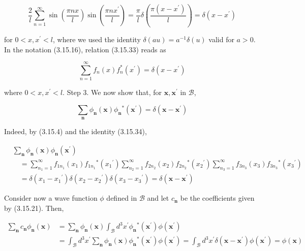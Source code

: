 \documentclass{article}
\begin{document}
\begin{equation*}
\frac{2}{l} \sum_{n=1}^{\infty} \sin \left(\frac{\pi n x}{l}\right) \sin \left(\frac{\pi n x^{\prime}}{l}\right)=\frac{\pi}{l} \delta\left(\frac{\pi\left(x-x^{\prime}\right)}{l}\right)=\delta\left(x-x^{\prime}\right) \tag{3.15.33}
\end{equation*}
 
for $0<x, x^{\prime}<l$, where we used the identity $\delta(a u)=a^{-1} \delta(u)$ valid for $a>0$. In the notation (3.15.16), relation (3.15.33) reads as
 
\begin{equation*}
\sum_{n=1}^{\infty} f_{n}(x) f_{n}^{*}\left(x^{\prime}\right)=\delta\left(x-x^{\prime}\right) \tag{3.15.34}
\end{equation*}
 
where $0<x, x^{\prime}<l$.
Step 3. We now show that, for $\boldsymbol{x}, \boldsymbol{x}^{\prime}$ in $\mathcal{B}$,
 
\begin{equation*}
\sum_{\boldsymbol{n}} \phi_{\boldsymbol{n}}(\boldsymbol{x}) \phi_{\boldsymbol{n}}{ }^{*}\left(\boldsymbol{x}^{\prime}\right)=\delta\left(\boldsymbol{x}-\boldsymbol{x}^{\prime}\right) \tag{3.15.35}
\end{equation*}
 

Indeed, by (3.15.4) and the identity (3.15.34),
 
\begin{align*}
& \sum_{\boldsymbol{n}} \phi_{\boldsymbol{n}}(\boldsymbol{x}) \phi_{\boldsymbol{n}}\left(\boldsymbol{x}^{\prime}\right)  \tag{3.15.36}\\
& \quad=\sum_{n_{1}=1}^{\infty} f_{1 n_{1}}\left(x_{1}\right) f_{1 n_{1}}{ }^{*}\left(x_{1}{ }^{\prime}\right) \sum_{n_{2}=1}^{\infty} f_{2 n_{2}}\left(x_{2}\right) f_{2 n_{2}}{ }^{*}\left(x_{2}{ }^{\prime}\right) \sum_{n_{3}=1}^{\infty} f_{3 n_{3}}\left(x_{3}\right) f_{3 n_{3}}{ }^{*}\left(x_{3}{ }^{\prime}\right) \\
& \quad=\delta\left(x_{1}-x_{1}{ }^{\prime}\right) \delta\left(x_{2}-x_{2}{ }^{\prime}\right) \delta\left(x_{3}-x_{3}{ }^{\prime}\right)=\delta\left(\boldsymbol{x}-\boldsymbol{x}^{\prime}\right)
\end{align*}
 

Consider now a wave function $\phi$ defined in $\mathcal{B}$ and let $c_{\boldsymbol{n}}$ be the coefficients given by (3.15.21). Then,
 
\begin{align*}
\sum_{\boldsymbol{n}} c_{\boldsymbol{n}} \phi_{\boldsymbol{n}}(\boldsymbol{x}) & =\sum_{\boldsymbol{n}} \phi_{\boldsymbol{n}}(\boldsymbol{x}) \int_{\mathcal{B}} d^{3} x^{\prime} \phi_{\boldsymbol{n}}{ }^{*}\left(\boldsymbol{x}^{\prime}\right) \phi\left(\boldsymbol{x}^{\prime}\right)  \tag{3.15.37}\\
& =\int_{\mathcal{B}} d^{3} x^{\prime} \sum_{\boldsymbol{n}} \phi_{\boldsymbol{n}}(\boldsymbol{x}) \phi_{\boldsymbol{n}}{ }^{*}\left(\boldsymbol{x}^{\prime}\right) \phi\left(\boldsymbol{x}^{\prime}\right)=\int_{\mathcal{B}} d^{3} x^{\prime} \delta\left(\boldsymbol{x}-\boldsymbol{x}^{\prime}\right) \phi\left(\boldsymbol{x}^{\prime}\right)=\phi(\boldsymbol{x})
\end{align*}
 
\end{document}
